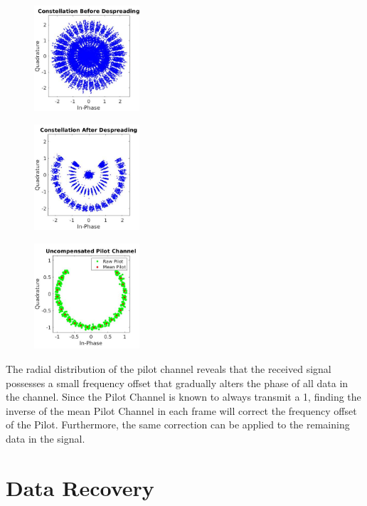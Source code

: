 \documentclass[twocolumn]{article}
\begin{document}
\begin{figure}[H]
    \centering
    \includegraphics[width=0.35\textwidth]{Uconst.jpg}
    \caption{}
    \label{fig:my_label}
\end{figure}
\begin{figure}[H]
    \centering
    \includegraphics[width=0.35\textwidth]{Sconst.jpg}
    \caption{}
    \label{fig}
\end{figure}
\begin{figure}[H]
    \centering
    \includegraphics[width=0.35\textwidth]{PilotChan.jpg}
    \caption{}
    \label{fig}
\end{figure}

The radial distribution of the pilot channel reveals that the received signal possesses a small frequency offset that gradually alters the phase of all data in the channel. Since the Pilot Channel is known to always transmit a 1, finding the inverse of the mean Pilot Channel in each frame will correct the frequency offset of the Pilot. Furthermore, the same correction can be applied to the remaining data in the signal. 

\section{Data Recovery}
\end{document}
